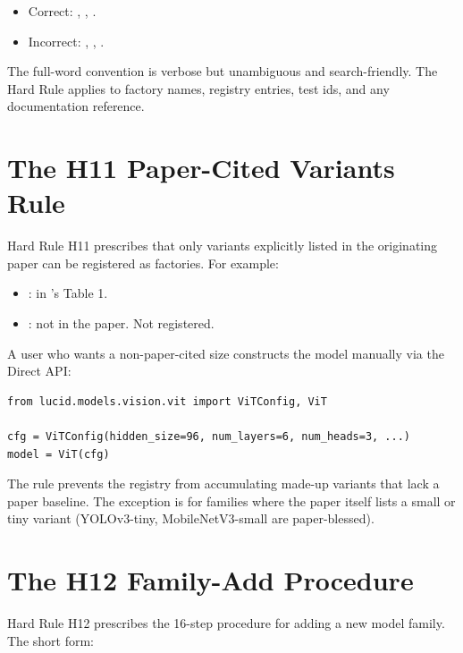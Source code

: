 \begin{itemize}
  \item Correct: , ,
    .
  \item Incorrect: , ,
    .
\end{itemize}

The full-word convention is verbose but unambiguous and
search-friendly. The Hard Rule applies to factory names,
registry entries, test ids, and any documentation reference.

\section{The H11 Paper-Cited Variants Rule}
\label{sec:zoo_architecture:h11_paper_rule}

Hard Rule H11 prescribes that only variants explicitly listed in
the originating paper can be registered as factories. For
example:

\begin{itemize}
  \item {}: in \cite{dosovitskiy_vit_2021}'s
    Table 1.
  \item {}: not in the paper. Not registered.
\end{itemize}

A user who wants a non-paper-cited size constructs the model
manually via the Direct API:

\begin{lstlisting}[style=lucid,language=LucidPython]
from lucid.models.vision.vit import ViTConfig, ViT

cfg = ViTConfig(hidden_size=96, num_layers=6, num_heads=3, ...)
model = ViT(cfg)
\end{lstlisting}

The rule prevents the registry from accumulating made-up
variants that lack a paper baseline. The exception is for
families where the paper itself lists a small or tiny variant
(YOLOv3-tiny, MobileNetV3-small are paper-blessed).

\section{The H12 Family-Add Procedure}
\label{sec:zoo_architecture:h12_family_add}

Hard Rule H12 prescribes the 16-step procedure for adding a new
model family. The short form:

